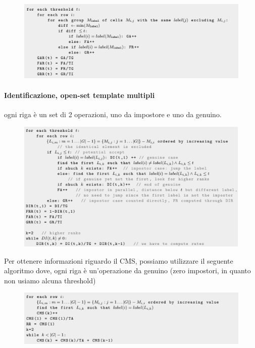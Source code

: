 \documentclass{article}
\begin{document}
\begin{figure}[H]
    \centering
    \includegraphics[width=5in]{imgs/verifica-mt.PNG}
    \caption{}
    \label{fig:verifica-mt}
\end{figure}

\paragraph{Identificazione, open-set template multipli} ogni riga è un set di 2 operazioni, uno da impostore e uno da genuino.

\begin{figure}[H]
    \centering
    \includegraphics[width=5in]{imgs/identificazione-mt1.PNG}
    \caption{}
    \label{fig:identificazione-mt}
\end{figure}

Per ottenere informazioni riguardo il CMS, possiamo utilizzare il seguente algoritmo dove, ogni riga è un'operazione da genuino (zero impostori, in quanto non usiamo alcuna threshold)

\begin{figure}[H]
    \centering
    \includegraphics[width=5in]{imgs/identificazione-mt2.PNG}
    \caption{}
    \label{fig:verifica-st}
\end{figure}
\end{document}
